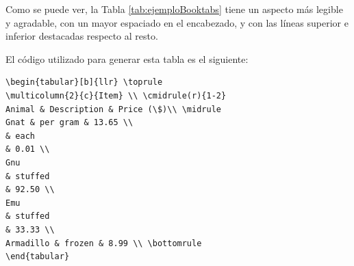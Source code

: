 \documentclass[12pt,a4paper, oneside]{report}
\begin{document}
\begin{table}[htb!]
\caption{Comparación entre tablas generadas con y sin \texttt{booktabs}}

\end{table}

Como se puede ver, la Tabla \ref{tab:ejemploBooktabs} tiene un aspecto más
legible y agradable, con un mayor espaciado en el encabezado, y con las líneas
superior e inferior destacadas respecto al resto.

El código utilizado para generar esta tabla es el siguiente:

\begin{lstlisting}
\begin{tabular}[b]{llr} \toprule
\multicolumn{2}{c}{Item} \\ \cmidrule(r){1-2}
Animal & Description & Price (\$)\\ \midrule
Gnat & per gram & 13.65 \\
& each
& 0.01 \\
Gnu
& stuffed
& 92.50 \\
Emu
& stuffed
& 33.33 \\
Armadillo & frozen & 8.99 \\ \bottomrule
\end{tabular}
\end{lstlisting}
\end{document}
